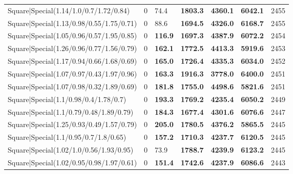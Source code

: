 \begin{tabular}{lrllllr}
 Square|Special(1.14/1.0/0.7/1.72/0.84)                        &             0   & 74.4           & \textbf{1803.3} & \textbf{4360.1} & \textbf{6042.1} &         2455 \\
 Square|Special(1.13/0.98/0.55/1.75/0.71)                      &             0   & 88.6           & \textbf{1694.5} & \textbf{4326.0} & \textbf{6168.7} &         2455 \\
 Square|Special(1.05/0.96/0.57/1.95/0.85)                      &             0   & \textbf{116.9} & \textbf{1697.3} & \textbf{4387.9} & \textbf{6072.2} &         2454 \\
 Square|Special(1.26/0.96/0.77/1.56/0.79)                      &             0   & \textbf{162.1} & \textbf{1772.5} & \textbf{4413.3} & \textbf{5919.6} &         2453 \\
 Square|Special(1.17/0.94/0.66/1.68/0.69)                      &             0   & \textbf{165.0} & \textbf{1726.4} & \textbf{4335.3} & \textbf{6034.0} &         2452 \\
 Square|Special(1.07/0.97/0.43/1.97/0.96)                      &             0   & \textbf{163.3} & \textbf{1916.3} & \textbf{3778.0} & \textbf{6400.0} &         2451 \\
 Square|Special(1.07/0.98/0.32/1.89/0.69)                      &             0   & \textbf{181.8} & \textbf{1755.0} & \textbf{4498.6} & \textbf{5821.6} &         2451 \\
 Square|Special(1.1/0.98/0.4/1.78/0.7)                         &             0   & \textbf{193.3} & \textbf{1769.2} & \textbf{4235.4} & \textbf{6050.2} &         2449 \\
 Square|Special(1.1/0.79/0.48/1.89/0.79)                       &             0   & \textbf{184.3} & \textbf{1677.4} & \textbf{4301.6} & \textbf{6076.6} &         2447 \\
 Square|Special(1.25/0.93/0.49/1.57/0.79)                      &             0   & \textbf{205.0} & \textbf{1780.5} & \textbf{4376.2} & \textbf{5865.5} &         2445 \\
 Square|Special(1.1/0.95/0.7/1.8/0.65)                         &             0   & \textbf{157.2} & \textbf{1710.3} & \textbf{4237.7} & \textbf{6120.5} &         2445 \\
 Square|Special(1.02/1.0/0.56/1.93/0.95)                       &             0   & 73.9           & \textbf{1788.7} & \textbf{4239.9} & \textbf{6123.2} &         2445 \\
 Square|Special(1.02/0.95/0.98/1.97/0.61)                      &             0   & \textbf{151.4} & \textbf{1742.6} & \textbf{4237.9} & \textbf{6086.6} &         2443 \\

\end{tabular}
